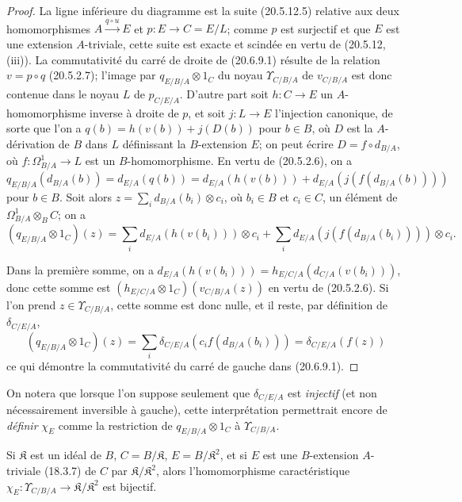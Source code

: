 \begin{proof}
La ligne inférieure du diagramme est la suite (20.5.12.5) relative aux
deux homomorphismes $A\xrightarrow{q\circ u}E$ et
$p:E\to C=E/L$; comme $p$ est surjectif et que $E$ est une extension
$A$-triviale, cette suite est exacte et scindée en vertu de (20.5.12,
(iii)). La commutativité du carré de droite de (20.6.9.1) résulte de la
relation $v=p\circ q$ (20.5.2.7); l'image par
$q_{E/B/A}\otimes1_C$ du noyau $\Upsilon_{C/B/A}$ de $v_{C/B/A}$ est
donc contenue dans le noyau $L$ de $p_{C/E/A}$. D'autre part soit
$h:C\to E$ un $A$-homomorphisme inverse à droite de $p$, et soit
$j:L\to E$ l'injection canonique, de sorte que l'on a
$q(b)=h(v(b))+j(D(b))$ pour $b\in B$, où $D$ est la $A$-dérivation de
$B$ dans $L$ définissant la $B$-extension $E$; on peut écrire
$D=f\circ d_{B/A}$, où $f:\Omega^1_{B/A}\to L$ est un
$B$-homomorphisme. En vertu de (20.5.2.6), on a
$q_{E/B/A}(d_{B/A}(b))=d_{E/A}(q(b))=d_{E/A}(h(v(b)))+d_{E/A}(j(f(d_{B/A}(b))))$
pour $b\in B$. Soit alors
$z=\sum_i d_{B/A}(b_i)\otimes c_i$, où $b_i\in B$ et $c_i\in C$, un
élément de $\Omega^1_{B/A}\otimes_B C$; on a
\[
  (q_{E/B/A}\otimes1_C)(z)=
  \sum_i d_{E/A}(h(v(b_i)))\otimes c_i+
  \sum_i d_{E/A}(j(f(d_{B/A}(b_i))))\otimes c_i.
\]

Dans la première somme, on a
$d_{E/A}(h(v(b_i)))=h_{E/C/A}(d_{C/A}(v(b_i)))$, donc cette somme est
$(h_{E/C/A}\otimes1_C)(v_{C/B/A}(z))$ en vertu de (20.5.2.6). Si l'on
prend $z\in\Upsilon_{C/B/A}$, cette somme est donc nulle, et il reste,
par définition de $\delta_{C/E/A}$,
\[
  (q_{E/B/A}\otimes1_C)(z)=
  \sum_i\delta_{C/E/A}(c_i f(d_{B/A}(b_i)))
  =\delta_{C/E/A}(f(z))
\]
ce qui démontre la commutativité du carré de gauche dans (20.6.9.1).
\end{proof}

On notera que lorsque l'on suppose seulement que $\delta_{C/E/A}$ est
\emph{injectif} (et non nécessairement inversible à gauche), cette
interprétation permettrait encore de \emph{définir} $\chi_E$ comme la
restriction de $q_{E/B/A}\otimes1_C$ à $\Upsilon_{C/B/A}$.

\begin{corollary}[20.6.10]
\label{0.20.6.10-fr}
Si $\mathfrak{K}$ est un idéal de $B$, $C=B/\mathfrak{K}$,
$E=B/\mathfrak{K}^2$, et si $E$ est une $B$-extension $A$-triviale
\textup{(18.3.7)} de $C$ par $\mathfrak{K}/\mathfrak{K}^2$, alors
l'homomorphisme caractéristique
$\chi_E:\Upsilon_{C/B/A}\to\mathfrak{K}/\mathfrak{K}^2$ est bijectif.
\end{corollary}

